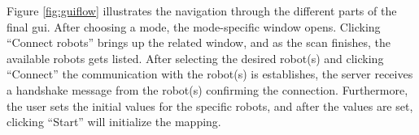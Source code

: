 Figure \ref{fig:guiflow} illustrates the navigation through the different parts of the final \acrshort{gui}. After choosing a mode, the mode-specific window opens. Clicking ``Connect robots'' brings up the related window, and as the scan finishes, the available robots gets listed. After selecting the desired robot(s) and clicking ``Connect'' the communication with the robot(s) is establishes, the server receives a handshake message from the robot(s) confirming the connection. Furthermore, the user sets the initial values for the specific robots, and after the values are set, clicking ``Start'' will initialize the mapping.

